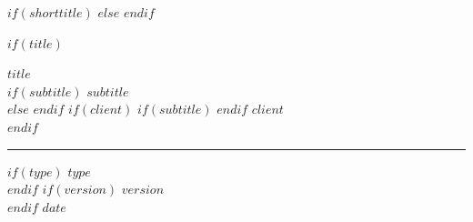 \documentclass[
    $if(fontsize)$$fontsize$$else$10pt$endif$,
    $if(papersize)$$papersize$$else$letterpaper$endif$,
    titlepage,
    oneside,
    openright,
    $if(is_draft)$draft$else$final$endif$,
    article]{memoir}
\begin{document}
$if(shorttitle)$
$else$
$endif$



%
$if(title)$
    \newlength{\centeroffset}
    \thispagestyle{empty}
    \vspace*{1.75in}
    \begin{flushright}
        \ifxetex \mytitlefont \fi
        {\fontsize{22pt}{26pt}\textbf{$title$}}\\
        \ifpdftex
            \vspace*{0.7em}
        \fi
        \ifxetex
            \vspace*{1em}
        \fi
        $if(subtitle)$
            {\fontsize{18pt}{20pt}\textbf{$subtitle$}}\\
        $else$
            \vspace*{0.0em}
        $endif$
        $if(client)$
            $if(subtitle)$
                \vspace*{0.7em}
            $endif$
            {\fontsize{18pt}{20pt}\textbf{$client$}}\\
        $endif$

        \vspace*{0.7em}
        \noindent\textcolor{DimGray}{\rule{\textwidth}{1pt}}
        \vspace*{0.0em}

        $if(type)$
            {\fontsize{16pt}{20pt}\textrm{$type$}}\\[0.7em]
        $endif$
        $if(version)$
            \vspace*{-0.2em}
            {\fontsize{12pt}{16pt}\textrm{\space $version$}}\\
            \vspace*{0.7em}
        $endif$
        {\fontsize{12pt}{16pt}\textrm{$date$}}\\[0.7em]


\end{flushright}
\end{document}
